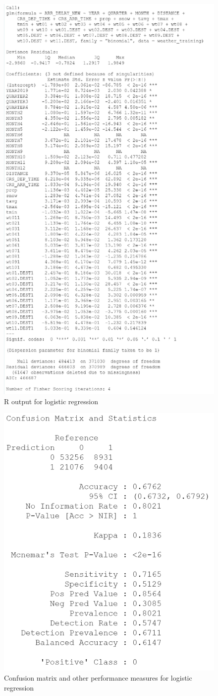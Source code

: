 \documentclass[12pt, a4paper, openany]{book}
\begin{document}
			\begin{figure}[h]
			\centering
	 		\includegraphics[width = .8\textwidth]{../figures/PLOTS FOR REPORT/Logistic Regression/summary(logit_reg)}
	 		\caption{R output for logistic regression}
	 		\end{figure}

			\begin{figure}[h]
			\centering
	 		\includegraphics[width = .45\textwidth]{../figures/PLOTS FOR REPORT/Logistic Regression/confusion matrix - logit reg}
	 		\caption{Confusion matrix and other performance measures for logistic regression}
	 		\end{figure}

\pagebreak


\nocite{*}

\end{document}
